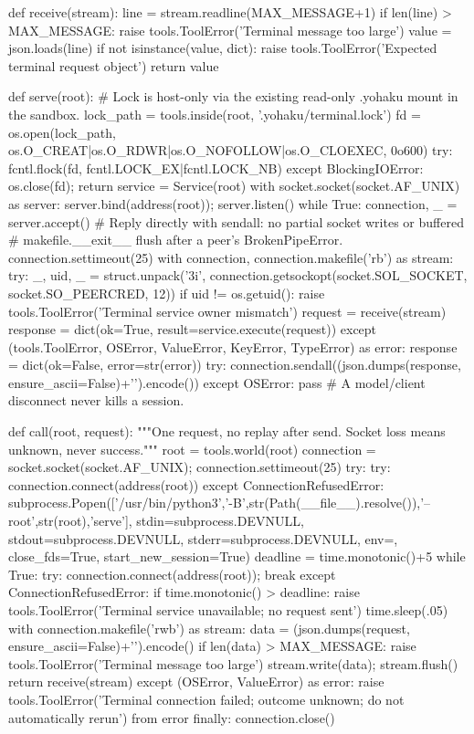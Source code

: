 def receive(stream):
    line = stream.readline(MAX_MESSAGE+1)
    if len(line) > MAX_MESSAGE: raise tools.ToolError('Terminal message too large')
    value = json.loads(line)
    if not isinstance(value, dict): raise tools.ToolError('Expected terminal request object')
    return value


def serve(root):
    # Lock is host-only via the existing read-only .yohaku mount in the sandbox.
    lock_path = tools.inside(root, '.yohaku/terminal.lock')
    fd = os.open(lock_path, os.O_CREAT|os.O_RDWR|os.O_NOFOLLOW|os.O_CLOEXEC, 0o600)
    try: fcntl.flock(fd, fcntl.LOCK_EX|fcntl.LOCK_NB)
    except BlockingIOError: os.close(fd); return
    service = Service(root)
    with socket.socket(socket.AF_UNIX) as server:
        server.bind(address(root)); server.listen()
        while True:
            connection, _ = server.accept()
            # Reply directly with sendall: no partial socket writes or buffered
            # makefile.__exit__ flush after a peer's BrokenPipeError.
            connection.settimeout(25)
            with connection, connection.makefile('rb') as stream:
                try:
                    _, uid, _ = struct.unpack('3i', connection.getsockopt(socket.SOL_SOCKET, socket.SO_PEERCRED, 12))
                    if uid != os.getuid(): raise tools.ToolError('Terminal service owner mismatch')
                    request = receive(stream)
                    response = dict(ok=True, result=service.execute(request))
                except (tools.ToolError, OSError, ValueError, KeyError, TypeError) as error:
                    response = dict(ok=False, error=str(error))
                try: connection.sendall((json.dumps(response, ensure_ascii=False)+'\n').encode())
                except OSError: pass  # A model/client disconnect never kills a session.


def call(root, request):
    """One request, no replay after send. Socket loss means unknown, never success."""
    root = tools.world(root)
    connection = socket.socket(socket.AF_UNIX); connection.settimeout(25)
    try:
        try: connection.connect(address(root))
        except ConnectionRefusedError:
            subprocess.Popen(['/usr/bin/python3','-B',str(Path(__file__).resolve()),'--root',str(root),'serve'],
                stdin=subprocess.DEVNULL, stdout=subprocess.DEVNULL, stderr=subprocess.DEVNULL,
                env={}, close_fds=True, start_new_session=True)
            deadline = time.monotonic()+5
            while True:
                try: connection.connect(address(root)); break
                except ConnectionRefusedError:
                    if time.monotonic() > deadline: raise tools.ToolError('Terminal service unavailable; no request sent')
                    time.sleep(.05)
        with connection.makefile('rwb') as stream:
            data = (json.dumps(request, ensure_ascii=False)+'\n').encode()
            if len(data) > MAX_MESSAGE: raise tools.ToolError('Terminal message too large')
            stream.write(data); stream.flush()
            return receive(stream)
    except (OSError, ValueError) as error:
        raise tools.ToolError('Terminal connection failed; outcome unknown; do not automatically rerun') from error
    finally: connection.close()


